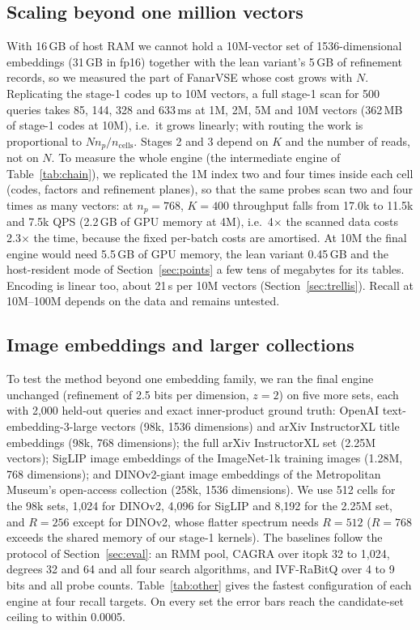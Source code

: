 \documentclass[fleqn,10pt]{wlscirep}
\begin{document}
\subsection{Scaling beyond one million vectors}
With 16\,GB of host RAM we cannot hold a 10M-vector set of 1536-dimensional embeddings (31\,GB in fp16) together with the lean variant's 5\,GB of refinement records, so we measured the part of FanarVSE whose cost grows with $N$. Replicating the stage-1 codes up to 10M vectors, a full stage-1 scan for 500 queries takes 85, 144, 328 and 633\,ms at 1M, 2M, 5M and 10M vectors (362\,MB of stage-1 codes at 10M), i.e.\ it grows linearly; with routing the work is proportional to $N n_p/n_{\mathrm{cells}}$. Stages 2 and 3 depend on $K$ and the number of reads, not on $N$. To measure the whole engine (the intermediate engine of Table~\ref{tab:chain}), we replicated the 1M index two and four times inside each cell (codes, factors and refinement planes), so that the same probes scan two and four times as many vectors: at $n_p=768$, $K=400$ throughput falls from 17.0k to 11.5k and 7.5k QPS (2.2\,GB of GPU memory at 4M), i.e.\ 4$\times$ the scanned data costs 2.3$\times$ the time, because the fixed per-batch costs are amortised. At 10M the final engine would need 5.5\,GB of GPU memory, the lean variant 0.45\,GB and the host-resident mode of Section~\ref{sec:points} a few tens of megabytes for its tables. Encoding is linear too, about 21\,s per 10M vectors (Section~\ref{sec:trellis}). Recall at 10M--100M depends on the data and remains untested.

\subsection{Image embeddings and larger collections}\label{sec:more}
To test the method beyond one embedding family, we ran the final engine unchanged (refinement of 2.5 bits per dimension, $z=2$) on five more sets, each with 2{,}000 held-out queries and exact inner-product ground truth: OpenAI text-embedding-3-large vectors (98k, 1536 dimensions) and arXiv InstructorXL title embeddings (98k, 768 dimensions); the full arXiv InstructorXL set (2.25M vectors); SigLIP image embeddings of the ImageNet-1k training images (1.28M, 768 dimensions); and DINOv2-giant image embeddings of the Metropolitan Museum's open-access collection (258k, 1536 dimensions). We use 512 cells for the 98k sets, 1{,}024 for DINOv2, 4{,}096 for SigLIP and 8{,}192 for the 2.25M set, and $R=256$ except for DINOv2, whose flatter spectrum needs $R=512$ ($R=768$ exceeds the shared memory of our stage-1 kernels). The baselines follow the protocol of Section~\ref{sec:eval}: an RMM pool, CAGRA over itopk 32 to 1{,}024, degrees 32 and 64 and all four search algorithms, and IVF-RaBitQ over 4 to 9 bits and all probe counts. Table~\ref{tab:other} gives the fastest configuration of each engine at four recall targets. On every set the error bars reach the candidate-set ceiling to within 0.0005.
\end{document}
